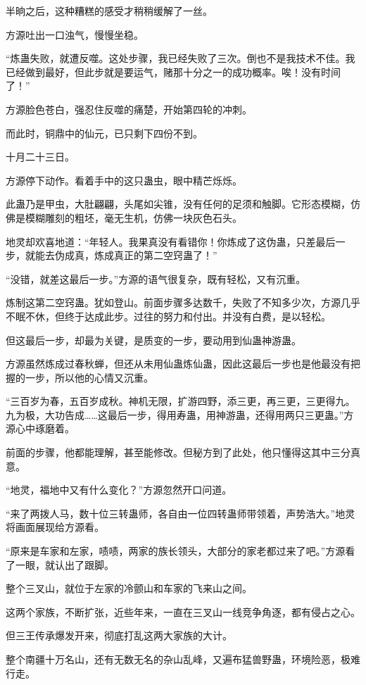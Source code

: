 \begin{this_body}
半晌之后，这种糟糕的感受才稍稍缓解了一丝。

方源吐出一口浊气，慢慢坐稳。

“炼蛊失败，就遭反噬。这处步骤，我已经失败了三次。倒也不是我技术不佳。我已经做到最好，但此步就是要运气，赌那十分之一的成功概率。唉！没有时间了！”

方源脸色苍白，强忍住反噬的痛楚，开始第四轮的冲刺。

而此时，铜鼎中的仙元，已只剩下四份不到。

十月二十三日。

方源停下动作。看着手中的这只蛊虫，眼中精芒烁烁。

此蛊乃是甲虫，大肚翩翩，头尾如尖锥，没有任何的足须和触脚。它形态模糊，仿佛是模糊雕刻的粗坯，毫无生机，仿佛一块灰色石头。

地灵却欢喜地道：“年轻人。我果真没有看错你！你炼成了这伪蛊，只差最后一步，就能去伪成真，炼成真正的第二空窍蛊了！”

“没错，就差这最后一步。”方源的语气很复杂，既有轻松，又有沉重。

炼制这第二空窍蛊。犹如登山。前面步骤多达数千，失败了不知多少次，方源几乎不眠不休，但终于达成此步。过往的努力和付出。并没有白费，是以轻松。

但这最后一步，却最为关键，是质变的一步，要动用到仙蛊神游蛊。

方源虽然炼成过春秋蝉，但还从未用仙蛊炼仙蛊，因此这最后一步也是他最没有把握的一步，所以他的心情又沉重。

“三百岁为春，五百岁成秋。神机无限，扩游四野，添三更，再三更，三更得九。九为极，大功告成……这最后一步，得用寿蛊，用神游蛊，还得用两只三更蛊。”方源心中琢磨着。

前面的步骤，他都能理解，甚至能修改。但秘方到了此处，他只懂得这其中三分真意。

“地灵，福地中又有什么变化？”方源忽然开口问道。

“来了两拨人马，数十位三转蛊师，各自由一位四转蛊师带领着，声势浩大。”地灵将画面展现给方源看。

“原来是车家和左家，啧啧，两家的族长领头，大部分的家老都过来了吧。”方源看了一眼，就认出了跟脚。

整个三叉山，就位于左家的冷颤山和车家的飞来山之间。

这两个家族，不断扩张，近些年来，一直在三叉山一线竞争角逐，都有侵占之心。

但三王传承爆发开来，彻底打乱这两大家族的大计。

整个南疆十万名山，还有无数无名的杂山乱峰，又遍布猛兽野蛊，环境险恶，极难行走。


\end{this_body}

